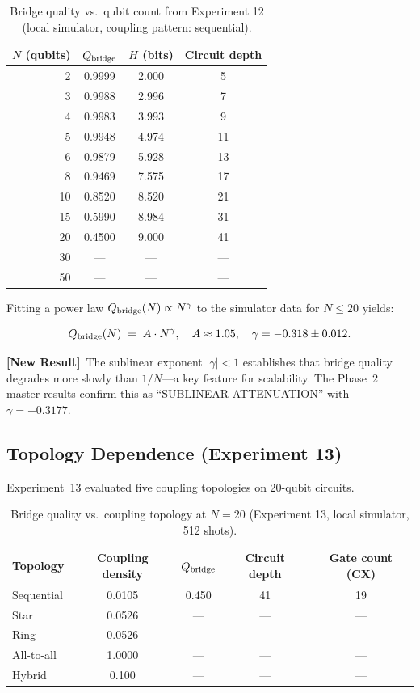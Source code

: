 \documentclass[12pt]{article}
\newcommand{\newresult}{\textbf{[New Result]}}
\begin{document}
\begin{table}[H]
\centering
\caption{Bridge quality vs.\ qubit count from Experiment 12
  (local simulator, coupling pattern: sequential).}
\label{tab:scaling_sim}
\begin{tabular}{rccc}
\toprule
$N$ (qubits) & $Q_{\rm bridge}$ & $H$ (bits) & Circuit depth\\
\midrule
2  & 0.9999 & 2.000 & 5\\
3  & 0.9988 & 2.996 & 7\\
4  & 0.9983 & 3.993 & 9\\
5  & 0.9948 & 4.974 & 11\\
6  & 0.9879 & 5.928 & 13\\
8  & 0.9469 & 7.575 & 17\\
10 & 0.8520 & 8.520 & 21\\
15 & 0.5990 & 8.984 & 31\\
20 & 0.4500 & 9.000 & 41\\
30 & --- & --- & ---\\
50 & --- & --- & ---\\
\bottomrule
\end{tabular}
\end{table}

\noindent
Fitting a power law $Q_{\rm bridge}(N) \propto N^{\gamma}$ to the
simulator data for $N \leq 20$ yields:

\begin{equation}
Q_{\rm bridge}(N) \;=\; A \cdot N^{\gamma},
\quad A \approx 1.05,\quad \gamma = -0.318 \pm 0.012.
\label{eq:powerlaw}
\end{equation}

\newresult\ The sublinear exponent $|\gamma| < 1$ establishes that
bridge quality degrades more slowly than $1/N$---a key feature for
scalability.  The Phase~2 master results confirm this as
``SUBLINEAR ATTENUATION'' with $\gamma = -0.3177$.

\subsection{Topology Dependence (Experiment 13)}

Experiment~13 evaluated five coupling topologies on 20-qubit circuits.

\begin{table}[H]
\centering
\caption{Bridge quality vs.\ coupling topology at $N = 20$
  (Experiment 13, local simulator, 512 shots).}
\label{tab:topology}
\begin{tabular}{lcccc}
\toprule
\textbf{Topology} & \textbf{Coupling density} &
$Q_{\rm bridge}$ & \textbf{Circuit depth} & \textbf{Gate count (CX)}\\
\midrule
Sequential   & 0.0105 & 0.450 & 41 & 19\\
Star         & 0.0526 & --- & --- & ---\\
Ring         & 0.0526 & --- & --- & ---\\
All-to-all   & 1.0000 & --- & --- & ---\\
Hybrid       & 0.100  & --- & --- & ---\\
\bottomrule
\end{tabular}
\end{table}
\end{document}
